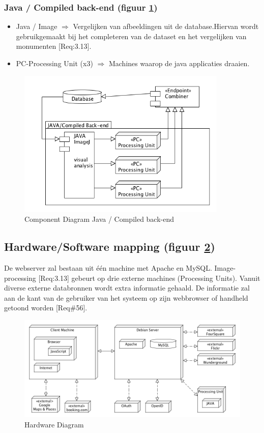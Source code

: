 \documentclass[a4paper,10pt]{article}
\begin{document}
		\subsubsection{Java / Compiled back-end (figuur \ref{componentdiagramprocessing})}
			\begin{itemize}
				\item Java / Image $\Rightarrow$ Vergelijken van afbeeldingen uit de database.Hiervan wordt gebruikgemaakt bij het completeren van de dataset en het vergelijken van monumenten [Req:3.13].
				\item PC-Processing Unit (x3) $\Rightarrow$ Machines waarop de java applicaties draaien.
			\end{itemize}
				\begin{figure}[ht!]
				\centering
				\includegraphics[width=10cm]{componentDiagram_processing.png}
				\caption{Component Diagram Java / Compiled back-end \label{componentdiagramprocessing}}
				\end{figure}
		
	\subsection{Hardware/Software mapping (figuur \ref{hardwarediagram})}
	De webserver zal bestaan uit \'e\'en machine met Apache en MySQL. Image-processing [Req:3.13] gebeurt op drie externe machines (Processing Units). Vanuit diverse externe databronnen wordt extra informatie gehaald. De informatie zal aan de kant van de gebruiker van het systeem op zijn webbrowser of handheld getoond worden [Req\#56].
	\begin{figure}[ht!]
	\centering
	\includegraphics[width=15cm]{hardwareDiagram.png}
	\caption{Hardware Diagram \label{hardwarediagram}}
	\end{figure}
	
\end{document}
